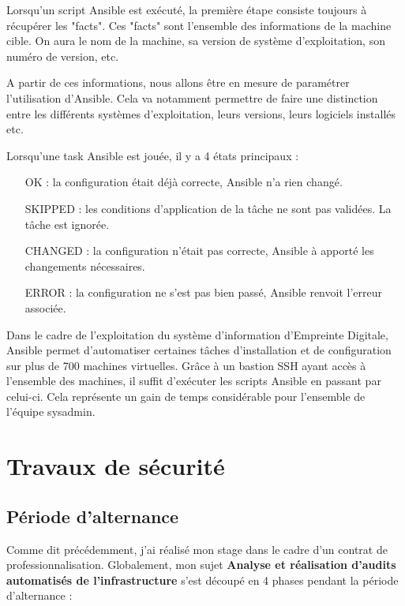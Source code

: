 \documentclass[12pt]{article}
\begin{document}
Lorsqu'un script Ansible est exécuté, la première étape consiste toujours à récupérer les "facts". 
Ces "facts" sont l'ensemble des informations de la machine cible. 
On aura le nom de la machine, sa version de système d'exploitation, son numéro de version, etc.

A partir de ces informations, nous allons être en mesure de paramétrer l'utilisation d'Ansible. 
Cela va notamment permettre de faire une distinction entre les différents systèmes d'exploitation, leurs versions, leurs logiciels installés etc.

Lorsqu'une task Ansible est jouée, il y a 4 états principaux :
\begin{itemize}
    \item [OK] : la configuration était déjà correcte, Ansible n'a rien changé.
    \item [SKIPPED] : les conditions d'application de la tâche ne sont pas validées. La tâche est ignorée.
    \item [CHANGED] : la configuration n'était pas correcte, Ansible à apporté les changements nécessaires.
    \item [ERROR] : la configuration ne s'est pas bien passé, Ansible renvoit l'erreur associée.
\end{itemize}

Dans le cadre de l'exploitation du système d'information d'Empreinte Digitale, Ansible permet d'automatiser certaines tâches d'installation et de configuration sur plus de 700 machines virtuelles. 
Grâce à un bastion SSH ayant accès à l'ensemble des machines, il suffit d'exécuter les scripts Ansible en passant par celui-ci. 
Cela représente un gain de temps considérable pour l'ensemble de l'équipe sysadmin.

\newpage
\section{Travaux de sécurité}
\subsection{Période d'alternance}
Comme dit précédemment, j'ai réalisé mon stage dans le cadre d'un contrat de professionnalisation. 
Globalement, mon sujet \textbf{Analyse et réalisation d'audits automatisés de l'infrastructure} s'est découpé en 4 phases pendant la période d'alternance :
\end{document}
